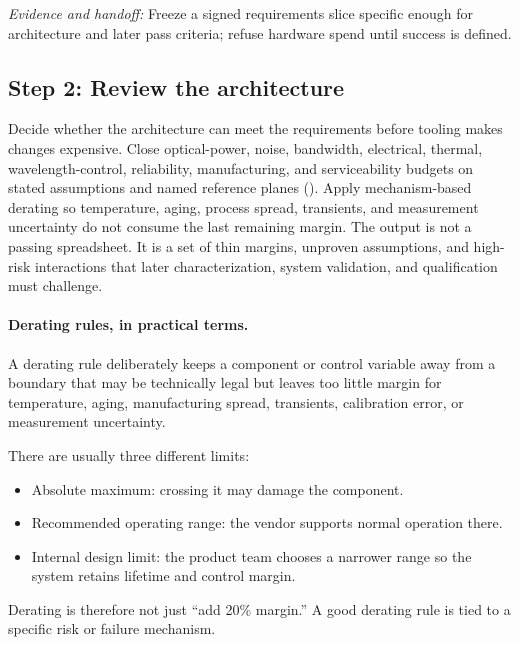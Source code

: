 \textit{Evidence and handoff:} Freeze a signed requirements slice specific
enough for architecture and later pass criteria; refuse hardware spend until
success is defined.

\subsection{Step 2: Review the architecture}
\label{sec:ladder-architecture}

Decide whether the architecture can meet the requirements before tooling makes
changes expensive. Close optical-power, noise, bandwidth, electrical, thermal,
wavelength-control, reliability, manufacturing, and serviceability budgets on
stated assumptions and named reference planes
().
Apply mechanism-based derating so temperature, aging, process spread,
transients, and measurement uncertainty do not consume the last remaining
margin. The output is not a passing spreadsheet. It is a set of thin margins,
unproven assumptions, and high-risk interactions that later characterization,
system validation, and qualification must challenge.

\paragraph{Derating rules, in practical terms.}
\label{sec:derating-rules}

A derating rule deliberately keeps a component or control variable away from a
boundary that may be technically legal but leaves too little margin for
temperature, aging, manufacturing spread, transients, calibration error, or
measurement uncertainty.

There are usually three different limits:
\begin{itemize}
\item Absolute maximum: crossing it may damage the component.
\item Recommended operating range: the vendor supports normal operation there.
\item Internal design limit: the product team chooses a narrower range so the
      system retains lifetime and control margin.
\end{itemize}
Derating is therefore not just ``add 20\% margin.'' A good derating rule is tied
to a specific risk or failure mechanism.

